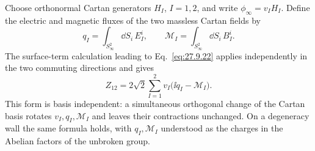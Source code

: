 \begin{enumerate}
  Choose orthonormal Cartan generators \(H_I\), \(I=1,2\), and write
  \(\phi_\infty=v_IH_I\).  Define the electric and magnetic fluxes of the
  two massless Cartan fields by
  \[
    q_I=\int_{S_\infty^2}\dd S_i\,E_I^i,\qquad
    \mathcal M_I=\int_{S_\infty^2}\dd S_i\,B_I^i .
    \tag{20}
  \]
  The surface-term calculation leading to
  Eq.~\eqref{eq:27.9.22} applies independently in the two commuting
  directions and gives
  \[
    Z_{12}=2\sqrt2\sum_{I=1}^2
       v_I\bigl(\ii q_I-\mathcal M_I\bigr).
    \tag{21}
  \]
  This form is basis independent: a simultaneous orthogonal change of the
  Cartan basis rotates \(v_I,q_I,\mathcal M_I\) and leaves their
  contractions unchanged.  On a degeneracy wall the same formula holds,
  with \(q_I,\mathcal M_I\) understood as the charges in the Abelian
  factors of the unbroken group.
\end{enumerate}
